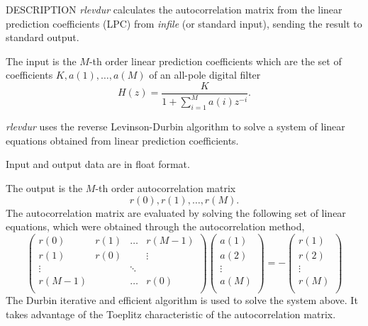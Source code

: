 \begin{synopsis}
\item [rlevdur] [ --m $M$ ] [ {\em infile} ]
\end{synopsis}

\begin{qsection}{DESCRIPTION}
{\em rlevdur} calculates the autocorrelation matrix from the linear
prediction coefficients (LPC) from {\em infile} (or standard input),
sending the result to standard output.

The input is the $M$-th order linear prediction coefficients which are
the set of coefficients $K, a(1), \dots, a(M)$ of an all-pole digital filter
\begin{displaymath}
H(z) = \frac{K}{\displaystyle{1+\sum_{i=1}^{M}a(i)z^{-i}}}.
\end{displaymath}

{\em rlevdur} uses the reverse Levinson-Durbin algorithm
to solve a system of linear equations
obtained from linear prediction coefficients.

Input and output data are in float format.

The output is the $M$-th order autocorrelation matrix
\begin{displaymath}
  r(0),r(1),\dots,r(M).
\end{displaymath}
The autocorrelation matrix are evaluated by solving
the following set of linear equations, which were obtained
through the autocorrelation method,
\begin{displaymath}
\begin{pmatrix}
        r(0) & r(1) & \dots & r(M-1) \\
        r(1) & r(0) &        & \vdots \\
        \vdots &    & \ddots &         \\
        r(M-1) &    & \dots & r(0)   \\
\end{pmatrix}
\begin{pmatrix}
	a(1) \\
	a(2) \\
	\vdots \\
	a(M) \\
\end{pmatrix}
= -
\begin{pmatrix}
	r(1) \\
	r(2) \\
	\vdots \\
	r(M) \\
\end{pmatrix}
\end{displaymath}
The Durbin iterative and efficient algorithm is used
to solve the system above. It takes advantage of the Toeplitz characteristic
of the autocorrelation matrix.
\end{qsection}

